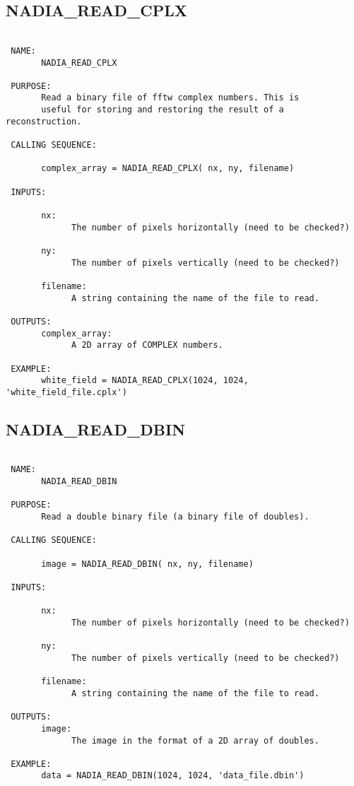   
 
\subsection{NADIA\_READ\_CPLX}
\begin{verbatim}

 NAME:
       NADIA_READ_CPLX

 PURPOSE:
       Read a binary file of fftw complex numbers. This is
       useful for storing and restoring the result of a reconstruction.

 CALLING SEQUENCE:

       complex_array = NADIA_READ_CPLX( nx, ny, filename)

 INPUTS:

       nx:
             The number of pixels horizontally (need to be checked?)

       ny:
             The number of pixels vertically (need to be checked?)

       filename:
             A string containing the name of the file to read.

 OUTPUTS:
       complex_array:
             A 2D array of COMPLEX numbers.

 EXAMPLE:
       white_field = NADIA_READ_CPLX(1024, 1024, 'white_field_file.cplx')

\end{verbatim}






  
 
\subsection{NADIA\_READ\_DBIN}
\begin{verbatim}

 NAME:
       NADIA_READ_DBIN

 PURPOSE:
       Read a double binary file (a binary file of doubles).

 CALLING SEQUENCE:

       image = NADIA_READ_DBIN( nx, ny, filename)

 INPUTS:

       nx:
             The number of pixels horizontally (need to be checked?)

       ny:
             The number of pixels vertically (need to be checked?)

       filename:
             A string containing the name of the file to read.

 OUTPUTS:
       image:
             The image in the format of a 2D array of doubles.

 EXAMPLE:
       data = NADIA_READ_DBIN(1024, 1024, 'data_file.dbin')

\end{verbatim}






